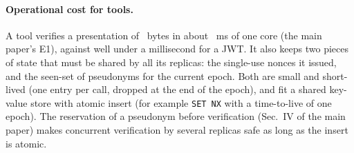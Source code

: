 \paragraph{Operational cost for tools.} A tool verifies a presentation of \PresB{}~bytes in about \VerMs{}~ms of one core (the main paper's E1), against well under a millisecond for a JWT. It also keeps two pieces of state that must be shared by all its replicas: the single-use nonces it issued, and the seen-set of pseudonyms for the current epoch. Both are small and short-lived (one entry per call, dropped at the end of the epoch), and fit a shared key-value store with atomic insert (for example \texttt{SET NX} with a time-to-live of one epoch). The reservation of a pseudonym before verification (Sec.~IV of the main paper) makes concurrent verification by several replicas safe as long as the insert is atomic.

